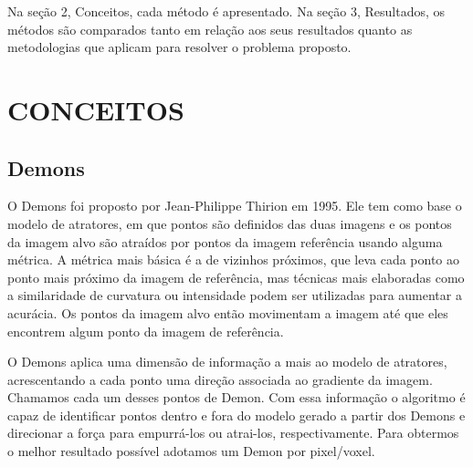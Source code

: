 \documentclass[]{spie}  %
\begin{document}
Na seção 2, Conceitos, cada método é apresentado. Na seção 3, Resultados, os métodos são comparados tanto em relação 
aos seus resultados quanto as metodologias que aplicam para resolver o problema proposto.

\section{CONCEITOS} 

\subsection{Demons}
	O Demons foi proposto por Jean-Philippe Thirion em 1995. Ele tem como base o modelo de atratores, em que pontos são
definidos das duas imagens e os pontos da imagem alvo são atraídos por pontos da imagem referência usando alguma 
métrica. A métrica mais básica é a de vizinhos próximos, que leva cada ponto ao ponto mais próximo da imagem de 
referência, mas técnicas mais elaboradas como a similaridade de curvatura ou intensidade podem ser utilizadas para 
aumentar a acurácia. Os pontos da imagem alvo então movimentam a imagem até que eles encontrem algum ponto da imagem
de referência.

	O Demons aplica uma dimensão de informação a mais ao modelo de atratores, acrescentando a cada ponto uma direção
associada ao gradiente da imagem. Chamamos cada um desses pontos de Demon. Com essa informação o algoritmo é capaz
de identificar pontos dentro e fora do modelo gerado a partir dos Demons e direcionar a força para empurrá-los ou
atrai-los, respectivamente. Para obtermos o melhor resultado possível adotamos um Demon por pixel/voxel.
\end{document}
